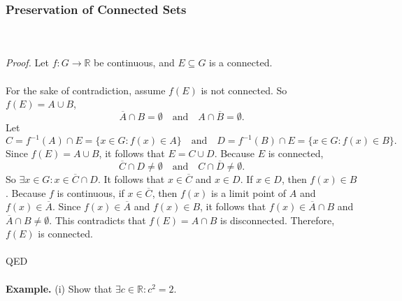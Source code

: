 \documentclass{article}
\begin{document}
            \subsubsection{Preservation of Connected Sets}
            \\ \\
            \textit{Proof.} Let $f:G \to \mathbb{R}$ be continuous, and $E \subseteq G$ is a connected.
            \\ \\
            For the sake of contradiction, assume $f(E)$ is not connected. So $f(E) = A \cup B$,
            \begin{equation*}
                \overline{A} \cap B = \emptyset \quad \text{and} \quad A \cap \overline{B} = \emptyset.
            \end{equation*}
            Let 
            \begin{equation*}
                C = f^{-1}(A) \cap E = \{x \in G: f(x) \in A\} \quad \text{and} \quad D = f^{-1}(B) \cap E = \{x \in G: f(x) \in B\}.
            \end{equation*}
            Since $f(E) = A \cup B$, it follows that $E = C \cup D$. Because $E$ is connected, 
            \begin{equation*}
                \overline{C} \cap D \neq \emptyset \quad \text{and} \quad C \cap \overline{D} \neq \emptyset.
            \end{equation*}
            So $\exists x \in G: x \in \overline{C} \cap D$. It follows that $x \in \overline{C}$ and $x \in D$. If $x \in D$, then $f(x) \in B$. Because $f$ is continuous, if $x \in \overline{C}$, then $f(x)$ is a limit point of $A$ and $f(x) \in \overline{A}$. Since $f(x) \in \overline{A}$ and $f(x) \in B$, it follows that $f(x) \in \overline{A} \cap B$ and $\overline{A} \cap B \neq \emptyset$. This contradicts that $f(E)=A \cap B$ is disconnected. Therefore, $f(E)$ is connected.
            \\ \\
            QED
            \\ \\
            \textbf{Example.} (i) Show that $\exists c \in \mathbb{R}: c^2=2$.
\end{document}
